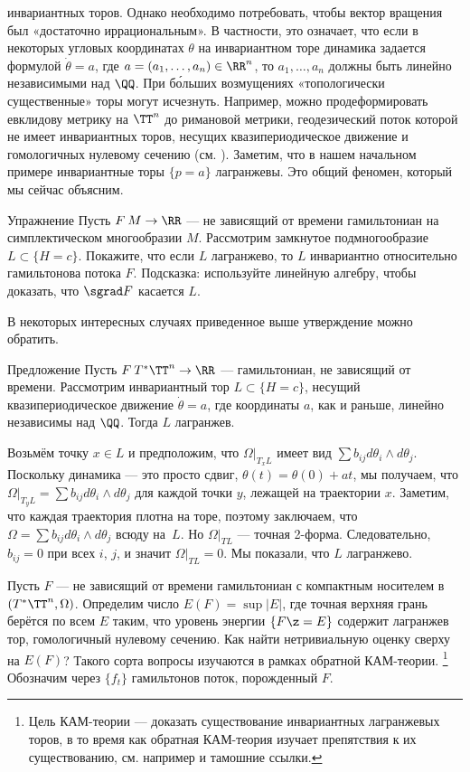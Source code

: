 инвариантных торов. 
Однако необходимо потребовать, чтобы вектор вращения был «достаточно
иррациональным». 
В частности, это означает, что если в некоторых угловых координатах
$\theta$ на инвариантном торе динамика задается формулой $\dot\theta =
a$, где $a = (a_1 ,\dots, a_n) \in \RR^n$, то $a_1 ,\dots, a_n$ должны
быть линейно независимыми над $\QQ$. 
При б\'{о}льших возмущениях «топологически существенные» торы могут исчезнуть.
Например, можно продеформировать евклидову метрику на $\TT^n$ до римановой метрики, геодезический поток которой не имеет инвариантных торов, несущих квазипериодическое движение и гомологичных нулевому сечению (см. \cite{AL}).
Заметим, что в нашем начальном примере инвариантные торы $\{p = a\}$ лагранжевы.
Это общий феномен, который мы сейчас объясним.

\begin{thm}{Упражнение}\label{8.1.A}
Пусть $F\: M \to \RR$ --- не зависящий от времени гамильтониан на симплектическом многообразии $M$.
Рассмотрим замкнутое подмногообразие $L \subset \{H = c\}$.
Покажите, что если $L$ лагранжево, то $L$ инвариантно относительно гамильтонова потока $F$.
Подсказка: используйте линейную алгебру, чтобы доказать, что $\sgrad F$ касается $L$.
\end{thm}

В некоторых интересных случаях приведенное выше утверждение можно обратить.

\begin{thm}[(\cite{He})]{Предложение}\label{8.1.B}
Пусть $F\: T^\ast \TT^n \to \RR$ --- гамильтониан, не зависящий от времени.
Рассмотрим инвариантный тор $L \subset \{H = c\}$, несущий
квазипериодическое движение $\dot\theta = a$, где координаты $a$, как и раньше, линейно независимы над $\QQ$.
Тогда $L$ лагранжев.
\end{thm}

Возьмём точку $x \in L$ и предположим, что $\Omega|_{T_x L}$ имеет вид $\sum b_{ij} d\theta_i \wedge d\theta_j$.
Поскольку динамика --- это просто сдвиг, $\theta (t) = \theta (0) + at$, мы получаем, что $\Omega|_{T_y L} = \sum b_{ij} d\theta_i \wedge d\theta_j$ для каждой точки $y$, лежащей на траектории $x$.
Заметим, что каждая траектория плотна на торе, поэтому заключаем, что $\Omega = \sum b_{ij} d\theta_i \wedge d\theta_j$ всюду на~$L$.
Но $\Omega|_{TL}$ --- точная 2-форма.
Следовательно, $b_{ij} = 0$ при всех $i$, $j$, и значит $\Omega|_{T L} = 0$. 
Мы показали, что $L$ лагранжево.
\qeds

Пусть $F$ --- не зависящий от времени гамильтониан с компактным носителем в $(T^\ast \TT^n, \Omega)$.
Определим число $E (F) = \sup | E |$, где точная верхняя грань берётся по всем $E$ таким, что уровень энергии $\{F \z= E\}$ содержит лагранжев тор, гомологичный нулевому сечению.
Как найти нетривиальную оценку сверху на $E (F)$?
Такого сорта вопросы изучаются в рамках обратной КАМ-теории.%
\footnote{Цель КАМ-теории --- доказать существование инвариантных лагранжевых торов, в то время как обратная КАМ-теория изучает препятствия к их существованию, см. например \cite{Mac} и тамошние ссылки.}
Обозначим через $\{f_t\}$ гамильтонов поток, порожденный $F$.

